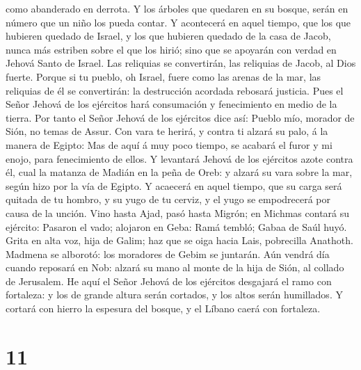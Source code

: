 como abanderado en derrota.  Y los árboles que quedaren
en su bosque, serán en número que un niño los pueda contar.
 Y acontecerá en aquel tiempo, que los que hubieren
quedado de Israel, y los que hubieren quedado de la casa de Jacob, nunca
más estriben sobre el que los hirió; sino que se apoyarán con verdad en
Jehová Santo de Israel.  Las reliquias se convertirán,
las reliquias de Jacob, al Dios fuerte.  Porque si tu
pueblo, oh Israel, fuere como las arenas de la mar, las reliquias de él
se convertirán: la destrucción acordada rebosará justicia.
 Pues el Señor Jehová de los ejércitos hará consumación y
fenecimiento en medio de la tierra.  Por tanto el Señor
Jehová de los ejércitos dice así: Pueblo mío, morador de Sión, no temas
de Assur. Con vara te herirá, y contra ti alzará su palo, á la manera de
Egipto:  Mas de aquí á muy poco tiempo, se acabará el
furor y mi enojo, para fenecimiento de ellos.  Y
levantará Jehová de los ejércitos azote contra él, cual la matanza de
Madián en la peña de Oreb: y alzará su vara sobre la mar, según hizo por
la vía de Egipto.  Y acaecerá en aquel tiempo, que su
carga será quitada de tu hombro, y su yugo de tu cerviz, y el yugo se
empodrecerá por causa de la unción.  Vino hasta Ajad,
pasó hasta Migrón; en Michmas contará su ejército: 
Pasaron el vado; alojaron en Geba: Ramá tembló; Gabaa de Saúl huyó.
 Grita en alta voz, hija de Galim; haz que se oiga hacia
Lais, pobrecilla Anathoth.  Madmena se alborotó: los
moradores de Gebim se juntarán.  Aún vendrá día cuando
reposará en Nob: alzará su mano al monte de la hija de Sión, al collado
de Jerusalem.  He aquí el Señor Jehová de los ejércitos
desgajará el ramo con fortaleza: y los de grande altura serán cortados,
y los altos serán humillados.  Y cortará con hierro la
espesura del bosque, y el Líbano caerá con fortaleza.

\hypertarget{section-10}{%
\section{11}\label{section-10}}

